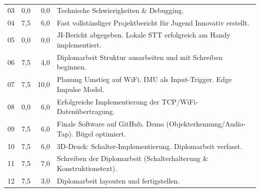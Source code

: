 \begin{longtable}{l r r p{\dimexpr\textwidth-4.5cm\relax}}
03 & 0,0 & 0,0 & Technische Schwierigkeiten \& Debugging. \\
04 & 7,5 & 6,0 & Fast vollständiger Projektbericht für Jugend Innovativ erstellt. \\
05 & 0,0 & 0,0 & JI-Bericht abgegeben. Lokale STT erfolgreich am Handy implementiert. \\
06 & 7,5 & 4,0 & Diplomarbeit Struktur ausarbeiten und mit Schreiben beginnen. \\
07 & 7,5 & 10,0 & Planung Umstieg auf WiFi. IMU als Input-Trigger. Edge Impulse Model. \\
08 & 0,0 & 6,0 & Erfolgreiche Implementierung der TCP/WiFi-Datenübertragung. \\
09 & 7,5 & 6,0 & Finale Software auf GitHub. Demo (Objekterkennung/Audio-Tap). Bügel optimiert. \\
10 & 7,5 & 6,0 & 3D-Druck: Schalter-Implementierung. Diplomarbeit verfasst. \\
11 & 7,5 & 7,0 & Schreiben der Diplomarbeit (Schalterhalterung \& Konstruktionstext). \\
12 & 7,5 & 3,0 & Diplomarbeit layouten und fertigstellen. \\
\end{longtable}